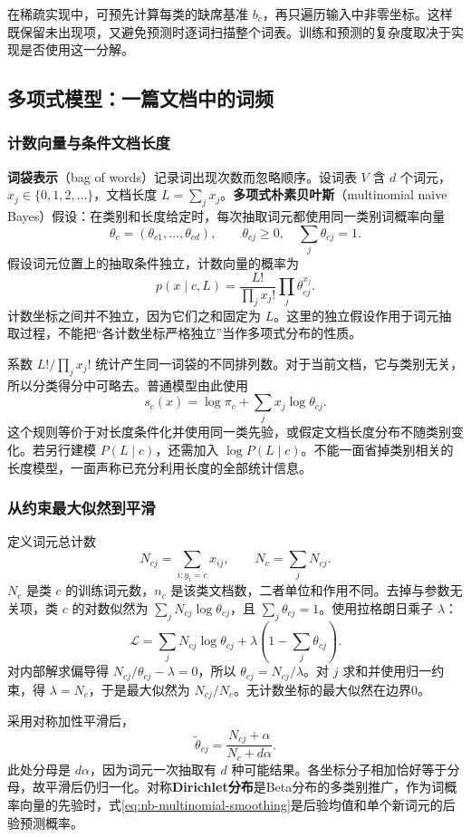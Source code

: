 \documentclass[UTF8,fontset=none,zihao=-4,a4paper]{ctexart}
\newcommand{\term}[1]{\textbf{#1}}
\numberwithin{equation}{section}
\numberwithin{figure}{section}
\begin{document}
在稀疏实现中，可预先计算每类的缺席基准 $b_c$，再只遍历输入中非零坐标。这样既保留未出现项，又避免预测时逐词扫描整个词表。训练和预测的复杂度取决于实现是否使用这一分解。

\subsection{多项式模型：一篇文档中的词频}
\subsubsection{计数向量与条件文档长度}
\term{词袋表示}（bag of words）记录词出现次数而忽略顺序。设词表 $V$ 含 $d$ 个词元，$x_j\in\{0,1,2,\ldots\}$，文档长度 $L=\sum_jx_j$。\term{多项式朴素贝叶斯}（multinomial naive Bayes）假设：在类别和长度给定时，每次抽取词元都使用同一类别词概率向量
\[
 \theta_c=(\theta_{c1},\ldots,\theta_{cd}),\qquad
 \theta_{cj}\ge0,\quad\sum_j\theta_{cj}=1.
\]
假设词元位置上的抽取条件独立，计数向量的概率为
\begin{equation}\label{eq:nb-multinomial}
 p(x\mid c,L)=\frac{L!}{\prod_j x_j!}\prod_j\theta_{cj}^{x_j}.
\end{equation}
计数坐标之间并不独立，因为它们之和固定为 $L$。这里的独立假设作用于词元抽取过程，不能把“各计数坐标严格独立”当作多项式分布的性质。

系数 $L!/\prod_jx_j!$ 统计产生同一词袋的不同排列数。对于当前文档，它与类别无关，所以分类得分中可略去。普通模型由此使用
\[
 s_c(x)=\log\pi_c+\sum_jx_j\log\theta_{cj}.
\]
这个规则等价于对长度条件化并使用同一类先验，或假定文档长度分布不随类别变化。若另行建模 $P(L\mid c)$，还需加入 $\log P(L\mid c)$。不能一面省掉类别相关的长度模型，一面声称已充分利用长度的全部统计信息。

\subsubsection{从约束最大似然到平滑}
定义词元总计数
\[
 N_{cj}=\sum_{i:y_i=c}x_{ij},\qquad N_c=\sum_jN_{cj}.
\]
$N_c$ 是类 $c$ 的训练词元数，$n_c$ 是该类文档数，二者单位和作用不同。去掉与参数无关项，类 $c$ 的对数似然为 $\sum_jN_{cj}\log\theta_{cj}$，且 $\sum_j\theta_{cj}=1$。使用拉格朗日乘子 $\lambda$：
\[
 \mathcal L=\sum_jN_{cj}\log\theta_{cj}
        +\lambda\left(1-\sum_j\theta_{cj}\right).
\]
对内部解求偏导得 $N_{cj}/\theta_{cj}-\lambda=0$，所以 $\theta_{cj}=N_{cj}/\lambda$。对 $j$ 求和并使用归一约束，得 $\lambda=N_c$，于是最大似然为 $N_{cj}/N_c$。无计数坐标的最大似然在边界0。

采用对称加性平滑后，
\begin{equation}\label{eq:nb-multinomial-smoothing}
 \widetilde\theta_{cj}=\frac{N_{cj}+\alpha}{N_c+d\alpha}.
\end{equation}
此处分母是 $d\alpha$，因为词元一次抽取有 $d$ 种可能结果。各坐标分子相加恰好等于分母，故平滑后仍归一化。对称\term{Dirichlet分布}是Beta分布的多类别推广，作为词概率向量的先验时，式\eqref{eq:nb-multinomial-smoothing}是后验均值和单个新词元的后验预测概率。
\end{document}
